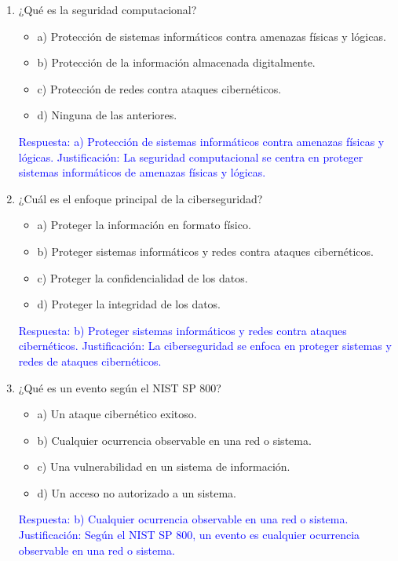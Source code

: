 \documentclass[a4paper]{article}
\begin{document}
\begin{enumerate}
    \item ¿Qué es la seguridad computacional?
    \begin{itemize}
        \item a) Protección de sistemas informáticos contra amenazas físicas y lógicas.
        \item b) Protección de la información almacenada digitalmente.
        \item c) Protección de redes contra ataques cibernéticos.
        \item d) Ninguna de las anteriores.
    \end{itemize}
    \textcolor{blue}{Respuesta: a) Protección de sistemas informáticos contra amenazas físicas y lógicas. Justificación: La seguridad computacional se centra en proteger sistemas informáticos de amenazas físicas y lógicas.}
    \vspace{1cm}
    
    \item ¿Cuál es el enfoque principal de la ciberseguridad?
    \begin{itemize}
        \item a) Proteger la información en formato físico.
        \item b) Proteger sistemas informáticos y redes contra ataques cibernéticos.
        \item c) Proteger la confidencialidad de los datos.
        \item d) Proteger la integridad de los datos.
    \end{itemize}
    \textcolor{blue}{Respuesta: b) Proteger sistemas informáticos y redes contra ataques cibernéticos. Justificación: La ciberseguridad se enfoca en proteger sistemas y redes de ataques cibernéticos.}
    \vspace{1cm}
    
    \item ¿Qué es un evento según el NIST SP 800?
    \begin{itemize}
        \item a) Un ataque cibernético exitoso.
        \item b) Cualquier ocurrencia observable en una red o sistema.
        \item c) Una vulnerabilidad en un sistema de información.
        \item d) Un acceso no autorizado a un sistema.
    \end{itemize}
    \textcolor{blue}{Respuesta: b) Cualquier ocurrencia observable en una red o sistema. Justificación: Según el NIST SP 800, un evento es cualquier ocurrencia observable en una red o sistema.}
    \vspace{1cm}
    

\end{enumerate}
\end{document}
